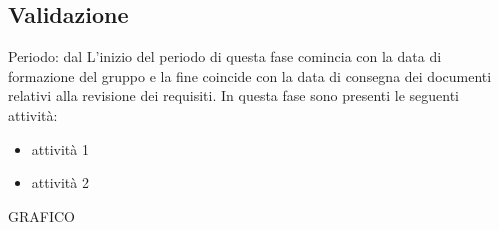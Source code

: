 \subsection{Validazione}
Periodo: dal
L'inizio del periodo di questa fase comincia con la data di formazione del gruppo e la fine coincide con la data di consegna dei documenti relativi alla revisione dei requisiti. In questa fase sono presenti le seguenti attività:
\begin{itemize}
\item attività 1
\item attività 2
\end{itemize}

GRAFICO